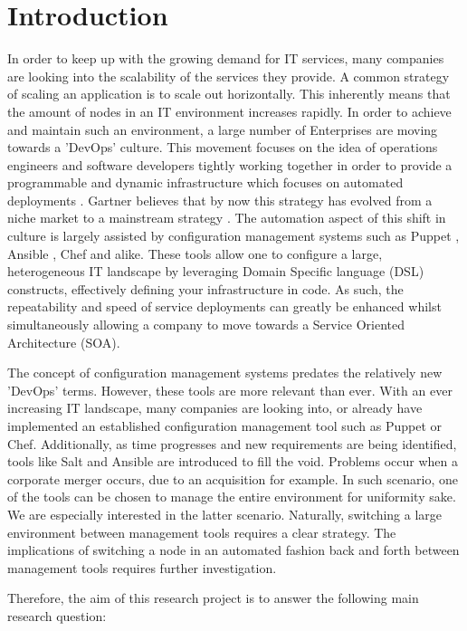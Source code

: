 \section{Introduction}\label{sec:introduction}
In order to keep up with the growing demand for IT services, many companies are looking into the scalability of the services they provide. A common strategy of scaling an application is to scale out horizontally. This inherently means that the amount of nodes in an IT environment increases rapidly. In order to achieve and maintain such an environment, a large number of Enterprises are moving towards a 'DevOps' culture. This movement focuses on the idea of operations engineers and software developers tightly working together in order to provide a programmable and dynamic infrastructure which focuses on automated deployments \cite{loukides_2012}. Gartner believes that by now this strategy has evolved from a niche market to a mainstream strategy \cite{gartner_2015}. The automation aspect of this shift in culture is largely assisted by configuration management systems such as Puppet \cite{whatispuppet}, Ansible \cite{whatisansible}, Chef \cite{whatischef} and alike. These tools allow one to configure a large, heterogeneous IT landscape by leveraging Domain Specific language (DSL)  constructs, effectively defining your infrastructure in code. As such, the repeatability and speed of service deployments can greatly be enhanced whilst simultaneously allowing a company to move towards a Service Oriented Architecture (SOA).

The concept of configuration management systems predates the relatively new 'DevOps' terms. However, these tools are more relevant than ever. With an ever increasing IT landscape, many companies are looking into, or already have implemented an established configuration management tool such as Puppet or Chef. Additionally, as time progresses and new requirements are being identified, tools like Salt and Ansible are introduced to fill the void. Problems occur when a corporate merger occurs, due to an acquisition for example. In such scenario, one of the tools can be chosen to manage the entire environment for uniformity sake. We are especially interested in the latter scenario. Naturally, switching a large environment between management tools requires a clear strategy. The implications of switching a node in an automated fashion back and forth between management tools requires further investigation. 

Therefore, the aim of this research project is to answer the following main research question:

